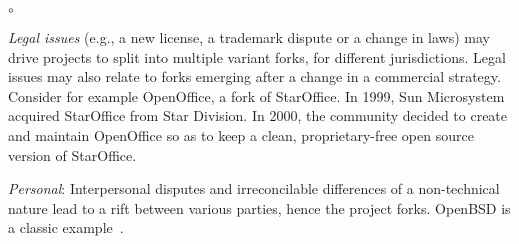 \begin{list}{$\circ$}{}
\item \textit{Legal issues} (e.g., a new license, a trademark dispute or a change in laws) may drive projects to split into multiple variant forks, for different jurisdictions. %
Legal issues may also relate to forks emerging after a change in a commercial strategy. Consider for example \textsf{OpenOffice}, a fork of \textsf{StarOffice}. In 1999, Sun Microsystem acquired \textsf{StarOffice} from Star Division. In 2000, the community decided to create and maintain \textsf{OpenOffice} so as to keep a clean, proprietary-free open source version of \textsf{StarOffice}. %

\item \textit{Personal}: Interpersonal disputes and irreconcilable differences of a non-technical nature lead to a rift between various parties, hence the project forks. OpenBSD is a classic example~\cite{Zhou:2020}.


\end{list}


